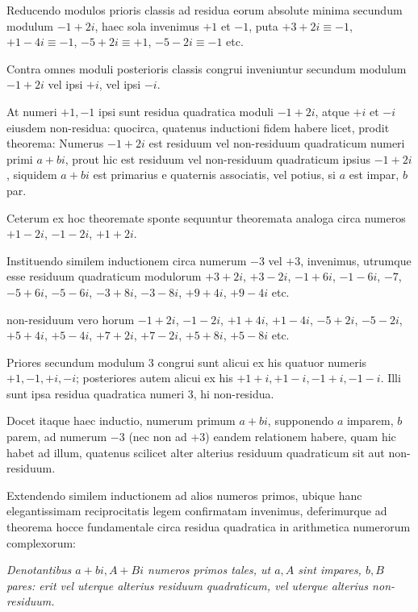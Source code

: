 Reducendo modulos prioris classis ad residua eorum absolute minima secundum modulum $-1+2i$, haec sola invenimus $+1$ et $-1$, puta $+3+2i\equiv-1$, $+1-4i\equiv-1$, $-5+2i\equiv+1$, $-5-2i\equiv-1$ etc.

Contra omnes moduli posterioris classis congrui inveniuntur secundum modulum $-1+2i$ vel ipsi $+i$, vel ipsi $-i$.

At numeri $+1,-1$ ipsi sunt residua quadratica moduli $-1+2i$, atque $+i$ et $-i$ eiusdem non-residua: quocirca, quatenus inductioni fidem habere licet, prodit theorema: Numerus $-1+2i$ est residuum vel non-residuum quadraticum numeri primi $a+bi$, prout hic est residuum vel non-residuum quadraticum ipsius $-1+2i$, siquidem $a+bi$ est primarius e quaternis associatis, vel potius, si $a$ est impar, $b$ par.

Ceterum ex hoc theoremate sponte sequuntur theoremata analoga circa numeros $+1-2i$, $-1-2i$, $+1+2i$.

Instituendo similem inductionem circa numerum $-3$ vel $+3$, invenimus, utrumque esse residuum quadraticum modulorum $+3+2i$, $+3-2i$,
%
$-1+6i$, $-1-6i$, $-7$, $-5+6i$, $-5-6i$, $-3+8i$, $-3-8i$, $+9+4i$, $+9-4i$ etc.

non-residuum vero horum $-1+2i$, $-1-2i$, $+1+4i$, $+1-4i$, $-5+2i$, $-5-2i$, $+5+4i$, $+5-4i$, $+7+2i$, $+7-2i$, $+5+8i$, $+5-8i$ etc.

Priores secundum modulum $3$ congrui sunt alicui ex his quatuor numeris $+1,-1,+i,-i$; posteriores autem alicui ex his $+1+i,+1-i,-1+i,-1-i$. Illi sunt ipsa residua quadratica numeri $3$, hi non-residua.

Docet itaque haec inductio, numerum primum $a+bi$, supponendo $a$ imparem, $b$ parem, ad numerum $-3$ (nec non ad $+3$) eandem relationem habere, quam hic habet ad illum, quatenus scilicet alter alterius residuum quadraticum sit aut non-residuum.

Extendendo similem inductionem ad alios numeros primos, ubique hanc elegantissimam reciprocitatis legem confirmatam invenimus, deferimurque ad theorema hocce fundamentale circa residua quadratica in arithmetica numerorum complexorum:

\emph{Denotantibus $a+bi,A+Bi$ numeros primos tales, ut $a,A$ sint impares, $b,B$ pares: erit vel uterque alterius residuum quadraticum, vel uterque alterius non-residuum.}

